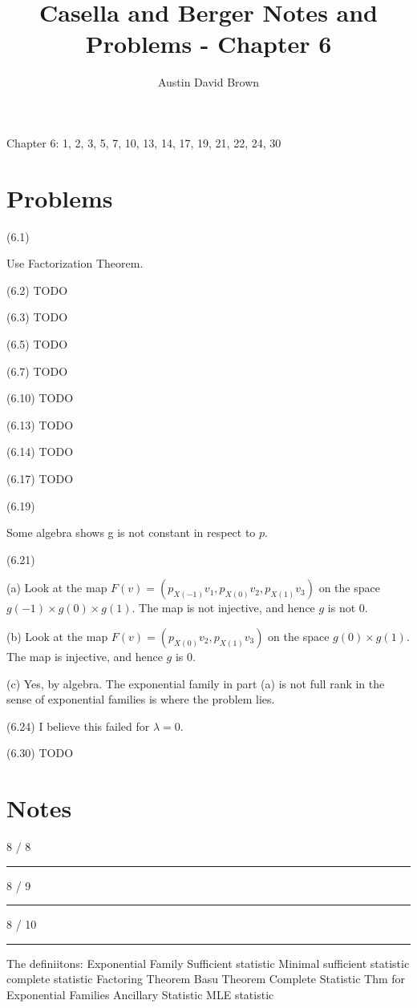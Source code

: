 \documentclass[12pt, reqno]{amsart}
\numberwithin{equation}{section}
\begin{document}
\title{Casella and Berger Notes and Problems -  Chapter 6}
\author{Austin David Brown}
\maketitle

Chapter 6: 1, 2, 3, 5, 7, 10, 13, 14, 17, 19, 21, 22, 24, 30

\section{Problems}

(6.1)

Use Factorization Theorem.

(6.2)
TODO

(6.3)
TODO

(6.5)
TODO

(6.7)
TODO

(6.10)
TODO

(6.13)
TODO

(6.14)
TODO

(6.17)
TODO

(6.19)

Some algebra shows g is not constant in respect to $p$.

(6.21)

(a) Look at the map $F(v) = (p_{X(-1)} v_1, p_{X(0)} v_2, p_{X(1)} v_3)$ on the space $g(-1) \times g(0) \times g(1)$. The map is not injective, and hence $g$ is not $0$.

(b) Look at the map $F(v) = (p_{X(0)} v_2, p_{X(1)} v_3)$ on the space $g(0) \times g(1)$. The map is injective, and hence $g$ is $0$.

(c) Yes, by algebra. The exponential family in part (a) is not full rank in the sense of exponential families is where the problem lies.

(6.24)
I believe this failed for $\lambda = 0.$

(6.30)
TODO

\section{Notes}

8 / 8
\rule{\textwidth}{.5pt}

8 / 9
\rule{\textwidth}{.5pt}

8 / 10
\rule{\textwidth}{.5pt}

The definiitons:
Exponential Family
Sufficient statistic
Minimal sufficient statistic
complete statistic
Factoring Theorem
Basu Theorem
Complete Statistic Thm for Exponential Families
Ancillary Statistic
MLE statistic
\end{document}
